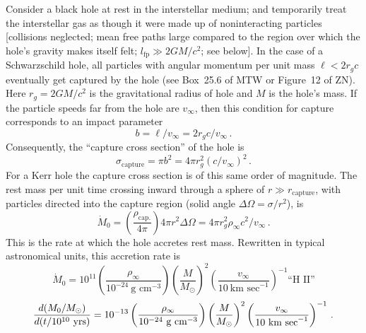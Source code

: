 Consider a black hole at rest in the interstellar medium; and temporarily treat
the interstellar gas as though it were made up of noninteracting particles
[collisions neglected; mean free paths large compared to the region over which
the hole's gravity makes itself felt; $l_\text{fp} \gg 2GM/c^2$; see below]. In the case of a
Schwarzschild hole, all particles with angular momentum per unit mass
$\ell < 2r_g c$  eventually get captured by the hole (see Box~25.6 of MTW or Figure~12
of ZN). Here $r_g = 2GM/c^2$ is the gravitational radius of hole and $M$ is the hole's
mass. If the particle speeds far from the hole are $v_\infty$, then this condition for
capture corresponds to an impact parameter
%
\begin{equation}
b = \ell / v_\infty = 2r_g c/v_\infty\,.
\tag{4.1.1}
\end{equation}
%
Consequently, the ``capture cross section'' of the hole is
%
\begin{equation}
\sigma_\text{capture} = \pi b^2 = 4\pi r_g^2 (c/v_\infty)^2\,.
\tag{4.1.2}
\end{equation}
%
For a Kerr hole the capture cross section is of this same order of magnitude. The
rest mass per unit time crossing inward through a sphere of $r \gg r_\text{capture}$, with
particles directed into the capture region (solid angle $\Delta\Omega = \sigma/r^2$), is
%
\begin{equation}
\dot{M}_0 = \left(\frac{\rho_\text{cap.}}{4\pi}\right) 4\pi r^2 \Delta\Omega = 4\pi r_g^2 \rho_\infty c^2 / v_\infty\,.
\tag{4.1.3}
\end{equation}
%
This is the rate at which the hole accretes rest mass. Rewritten in typical astro\-nomical units, this accretion rate is
%
\begin{equation}
\dot{M}_0 = 10^{11} \left(\frac{\rho_\infty}{10^{-24}~\text{g~cm}^{-3}}\right) \left(\frac{M}{M_\odot}\right)^2 \left(\frac{v_\infty}{10~\text{km~sec}^{-1}}\right)^{-1} \text{``H~II''}
\tag{4.1.3$'$}
\end{equation}
%
\begin{equation}
\frac{d(M_0/M_\odot)}{d(t/10^{10}~\text{yrs})} = 10^{-13} \left(\frac{\rho_\infty}{10^{-24}~\text{g~cm}^{-3}}\right) \left(\frac{M}{M_\odot}\right)^2 \left(\frac{v_\infty}{10~\text{km~sec}^{-1}}\right)^{-1}\,.
\notag
\end{equation}


